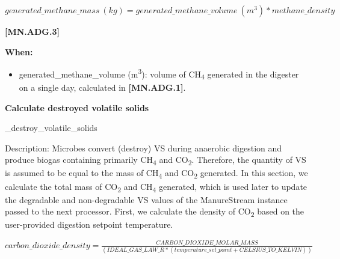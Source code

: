 \begin{refsection}
\begin{itemize}
    \end{itemize}
    \vspace{0.2cm}

    \begin{center}
\(generated\_methane\_mass\ (kg) = generated\_methane\_volume\ (m^3)  * methane\_density \)
    \end{center}
        \vspace{0.5cm} 
    
            {\raggedleft \textbf{[MN.ADG.3]}\par}
            \vspace{0.5cm}

\textbf{When:}
    \begin{itemize}
        \item generated\_methane\_volume (m\textsuperscript{3}): volume of CH\textsubscript{4} generated in the digester on a single day, calculated in \textbf{[MN.ADG.1]}.

    \end{itemize}
    \vspace{0.2cm}


    \textbf{Calculate destroyed volatile solids}
    \vspace{ 0.25cm}
    
    \_destroy\_volatile\_solids
    \vspace{0.2cm}
    
    Description: Microbes convert (destroy) VS during anaerobic digestion and produce biogas containing primarily CH\textsubscript{4} and CO\textsubscript{2}. Therefore, the quantity of VS is assumed to be equal to the mass of CH\textsubscript{4} and CO\textsubscript{2} generated. In this section, we calculate the total mass of CO\textsubscript{2} and CH\textsubscript{4} generated, which is used later to update the degradable and non-degradable VS values of the ManureStream instance passed to the next processor.
        \vspace{0.5cm} 
First, we calculate the density of CO\textsubscript{2} based on the user-provided digestion setpoint temperature.
            \vspace{0.5cm}

    \begin{center}
\(carbon\_dioxide\_density = \frac{CARBON\_DIOXIDE\_MOLAR\_MASS }{(IDEAL\_GAS\_LAW\_R * (temperature\_set\_point + CELSIUS\_TO\_KELVIN))}\)
    \end{center}
        \vspace{0.5cm} 
    

\end{refsection}
